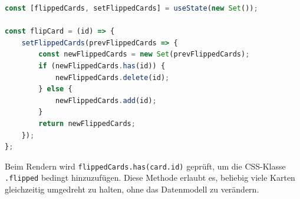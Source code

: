 \begin{lstlisting}[language=JavaScript, caption={Nutzung eines Sets für UI-Zustand}]
const [flippedCards, setFlippedCards] = useState(new Set());

const flipCard = (id) => {
    setFlippedCards(prevFlippedCards => {
        const newFlippedCards = new Set(prevFlippedCards);
        if (newFlippedCards.has(id)) {
            newFlippedCards.delete(id);
        } else {
            newFlippedCards.add(id);
        }
        return newFlippedCards;
    });
};
\end{lstlisting}

Beim Rendern wird \texttt{flippedCards.has(card.id)} geprüft, um die CSS-Klasse \texttt{.flipped} bedingt hinzuzufügen. Diese Methode erlaubt es, beliebig viele Karten gleichzeitig umgedreht zu halten, ohne das Datenmodell zu verändern.
\newpage

